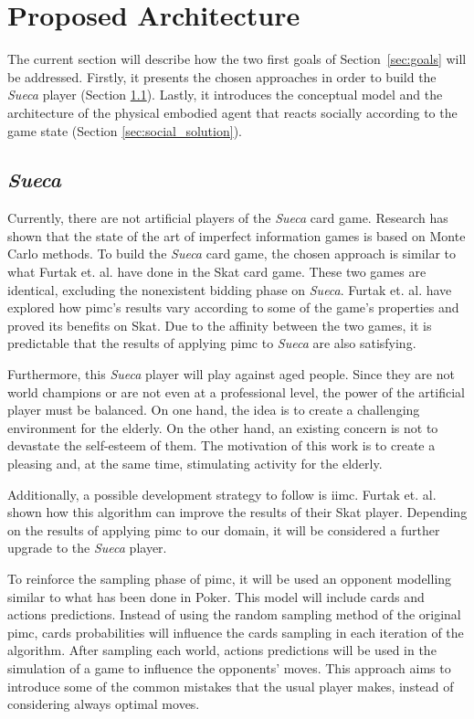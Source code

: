 \section{Proposed Architecture} \label{sec:architecture}

The current section will describe how the two first goals of
Section~\ref{sec:goals} will be addressed.
Firstly, it presents the chosen approaches in order to build the \emph{Sueca} player (Section \ref{sec:sueca_solution}).
Lastly, it introduces the conceptual model and the architecture of the physical embodied agent that reacts socially according to the game state (Section \ref{sec:social_solution}).


\subsection{\emph{Sueca}}
\label{sec:sueca_solution}

Currently, there are not artificial players of the \emph{Sueca} card game.
Research has shown that the state of the art of imperfect information games is based on Monte Carlo methods.
To build the \emph{Sueca} card game, the chosen approach is similar to what Furtak et. al. have done in the Skat card game.
These two games are identical, excluding the nonexistent bidding phase on \emph{Sueca}.
Furtak et. al. have explored how \gls{pimc}'s results vary according to some of the game's properties and proved its benefits on Skat.
Due to the affinity between the two games, it is predictable that the results of applying \gls{pimc} to \emph{Sueca} are also satisfying.

Furthermore, this \emph{Sueca} player will play against aged people.
Since they are not world champions or are not even at a professional level, the power of the artificial player must be balanced.
On one hand, the idea is to create a challenging environment for the elderly.
On the other hand, an existing concern is not to devastate the self-esteem of them.
The motivation of this work is to create a pleasing and, at the same time, stimulating activity for the elderly.

Additionally, a possible development strategy to follow is \gls{iimc}.
Furtak et. al. shown how this algorithm can improve the results of their Skat player.
Depending on the results of applying \gls{pimc} to our domain, it will be considered a further upgrade to the \emph{Sueca} player.

To reinforce the sampling phase of \gls{pimc}, it will be used an opponent modelling similar to what has been done in Poker.
This model will include cards and actions predictions.
Instead of using the random sampling method of the original \gls{pimc}, cards probabilities will influence the cards sampling in each iteration of the algorithm.
After sampling each world, actions predictions will be used in the simulation of a game to influence the opponents' moves.
This approach aims to introduce some of the common mistakes that the usual player makes, instead of considering always optimal moves.


